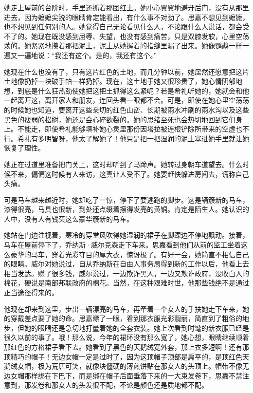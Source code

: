 \par 她走上屋前的台阶时，手里还抓着那团红土。她小心翼翼地避开后门，没有从那里进去，因为嬷嬷尖锐的眼睛肯定能看出，有什么事不对劲了。思嘉不想见到嬷嬷，也不想见到任何别的人。她觉得自己无论看见什么人，不论跟什么人说话，都会受不了的。她现在既没感到屈辱、失望，也没有感到痛苦，只是双膝发软，心里空荡荡的。她紧紧地攥着那把泥土，泥土从她握着的指缝里漏了出来。她像鹦鹉一样一遍又一遍地说：“我还有这个。是的，我还有这个。”
\par 她现在什么也没有了，只有这片红色的土地，而几分钟以前，她居然还愿意把这片土地像扔掉一块破手帕一样扔掉。现在，这土地于她又很珍贵了，她心情阴郁地想，到底是什么狂热劲使她把这把土抓得这么紧呢？若是希礼听她的，她就会和他一起离开这，离开家人和朋友，连回头看一眼都不会。可是，即使在她心里空荡荡的时候她也知道，要离开这些亲切的红色山峦、长期被雨水冲刷的雨水沟以及这些黑色的瘦弱的松树，她还是会心碎欲裂的。她的思绪至死也会热切地回到它们身上。不能走，即使希礼能够填补她心灵里那份因塔拉被连根铲除所带来的空虚也不行。希礼有多明智呀，他太了解她了！他只是把一把湿润的泥土塞进她手里就让她恢复了理性。
\par 她正在过道里准备把门关上，这时却听到了马蹄声。她转过身朝车道望去。什么时候不来，偏偏这时候有人来访，这真让人受不了。她要赶快躲进房间去，谎称自己头痛。
\par 可是马车越来越近时，她却吃了一惊，停下了要逃跑的脚步。这是辆簇新的马车，漆得很亮，马具也很新，到处还点缀着擦得发亮的黄铜。肯定是陌生人。她认识的人中，没有人有钱买这么豪华簇新的马车。
\par 她站在门边注视着，寒冷的穿堂风吹得她湿润的裙子在脚踝边不停地飘动。接着，马车在屋前停下了，乔纳斯·威尔克森走下车来。思嘉看到他们从前的监工坐着这么豪华的马车，穿着光彩夺目的厚大衣，惊讶极了。有好一会，她简直不相信自己的眼睛。威尔对她说过，自从乔纳斯在自由人事务局得到新的工作以后，他看上去相当发达。赚了很多钱，威尔说过，一边欺诈黑人，一边又欺诈政府，没收白人的棉花，硬说是南部邦联政府的棉花。当然，在这种艰难时世，他那些钱绝不是通过正当途径得来的。
\par 他现在却来到这里，步出一辆漂亮的马车，再牵着一个女人的手扶她走下车来，她的穿戴差点要了她的命。思嘉瞟了一眼，看到那衣服光彩靓丽，简直到了粗俗的地步，但她的眼睛还是急切地打量着她的全套衣装。她上次看到时髦的新衣服已经是很久以前的事了。哦！那么说，今年的裙环没有那么宽了，她心想，眼睛继续顺着那红色的方格裙子看下去。她看到了黑色的天鹅绒宽外套，那上衣多短啊！还有那顶精巧的帽子！无边女帽一定是过时了，因为这顶帽子顶部是扁平的，是顶红色天鹅绒女帽，极为荒唐可笑，就像块僵硬的薄煎饼贴在那女人的头顶上。帽带不像无边女帽那样绑在下巴下，而是绑在帽子后面垂落下来的一大束发卷下，思嘉不禁注意到，那发卷和那女人的头发很不配，不论是颜色还是质地都不配。
